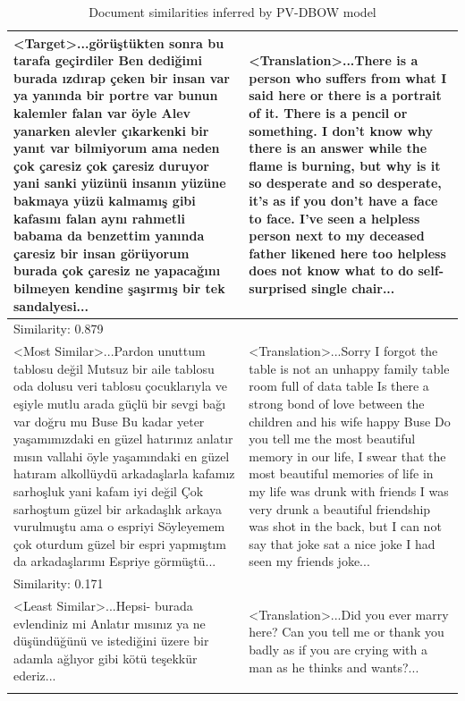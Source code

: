 \begin{table}[h]
    \centering
    \small
    \caption{Document similarities inferred by PV-DBOW model}
    \begin{tabular}{p{6.5cm}|p{6cm}}
        \Xhline{2\arrayrulewidth}
        \textless Target\textgreater ...görüştükten sonra bu tarafa geçirdiler Ben dediğimi burada ızdırap çeken bir insan var ya yanında bir portre var bunun kalemler falan var öyle Alev yanarken alevler çıkarkenki bir yanıt var bilmiyorum ama neden çok çaresiz çok çaresiz duruyor yani sanki yüzünü insanın yüzüne bakmaya yüzü kalmamış gibi kafasını falan aynı rahmetli babama da benzettim yanında çaresiz bir insan görüyorum burada çok çaresiz ne yapacağını bilmeyen kendine şaşırmış bir tek sandalyesi... & \textless Translation\textgreater ...There is a person who suffers from what I said here or there is a portrait of it. There is a pencil or something. I don't know why there is an answer while the flame is burning, but why is it so desperate and so desperate, it's as if you don't have a face to face. I've seen a helpless person next to my deceased father likened here too helpless does not know what to do self-surprised single chair... \\
        \hline
        \multicolumn{2}{l}{Similarity: 0.879} \\
        \hline
        \textless Most Similar\textgreater ...Pardon unuttum tablosu değil Mutsuz bir aile tablosu oda dolusu veri tablosu çocuklarıyla ve eşiyle mutlu arada güçlü bir sevgi bağı var doğru mu Buse Bu kadar yeter yaşamımızdaki en güzel hatırınız anlatır mısın vallahi öyle yaşamındaki en güzel hatıram alkollüydü arkadaşlarla kafamız sarhoşluk yani kafam iyi değil Çok sarhoştum güzel bir arkadaşlık arkaya vurulmuştu ama o espriyi Söyleyemem çok oturdum güzel bir espri yapmıştım da arkadaşlarımı Espriye görmüştü... & \textless Translation\textgreater ...Sorry I forgot the table is not an unhappy family table room full of data table Is there a strong bond of love between the children and his wife happy Buse Do you tell me the most beautiful memory in our life, I swear that the most beautiful memories of life in my life was drunk with friends I was very drunk a beautiful friendship was shot in the back, but I can not say that joke sat a nice joke I had seen my friends joke... \\
        \hline
        \multicolumn{2}{l}{Similarity: 0.171} \\
        \hline
        \textless Least Similar\textgreater ...Hepsi- burada evlendiniz mi Anlatır mısınız ya ne düşündüğünü ve istediğini üzere bir adamla ağlıyor gibi kötü teşekkür ederiz... & \textless Translation\textgreater ...Did you ever marry here? Can you tell me or thank you badly as if you are crying with a man as he thinks and wants?... \\
        \Xhline{2\arrayrulewidth}
    \end{tabular}
    \label{tab:doc_sim_dbow}
\end{table}
